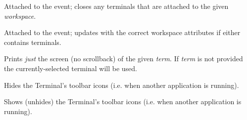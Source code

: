 \documentclass[letterpaper,10pt,openany]{sphinxmanual}
\begin{document}

\begin{fulllineitems}
\label{Applications/terminal/js_terminal:GateOne.Terminal.workspaceClosedEvent}
Attached to the  event; closes any terminals that are attached to the given \emph{workspace}.

\end{fulllineitems}


\begin{fulllineitems}
\label{Applications/terminal/js_terminal:GateOne.Terminal.swappedWorkspacesEvent}
Attached to the  event; updates  with the correct workspace attributes if either contains terminals.

\end{fulllineitems}


\begin{fulllineitems}
\label{Applications/terminal/js_terminal:GateOne.Terminal.printScreen}
Prints \emph{just} the screen (no scrollback) of the given \emph{term}.  If \emph{term} is not provided the currently-selected terminal will be used.

\end{fulllineitems}


\begin{fulllineitems}
\label{Applications/terminal/js_terminal:GateOne.Terminal.hideIcons}
Hides the Terminal's toolbar icons (i.e. when another application is running).

\end{fulllineitems}


\begin{fulllineitems}
\label{Applications/terminal/js_terminal:GateOne.Terminal.showIcons}
Shows (unhides) the Terminal's toolbar icons (i.e. when another application is running).

\end{fulllineitems}
\end{document}
